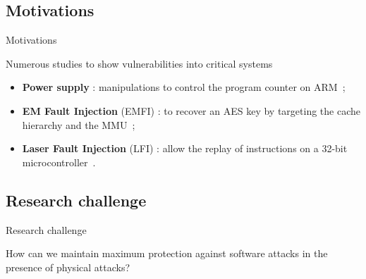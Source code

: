 \subsection{Motivations}
\begin{frame}{Motivations}
    \begin{block}{Numerous studies to show vulnerabilities into critical systems}
        \begin{itemize}
            \item \textbf{Power supply} : manipulations to control the program counter on ARM~\cite{TSW-16-fdtc};
            \item \textbf{EM Fault Injection} (EMFI) : to recover an AES key by targeting the cache hierarchy and the MMU~\cite{TBELB-21-jce};
            \item \textbf{Laser Fault Injection} (LFI) : allow the replay of instructions on a 32-bit microcontroller~\cite{KDD-21-dsd}.
        \end{itemize}
    \end{block}

\end{frame}
\subsection{Research challenge}
\begin{frame}{Research challenge}
    \begin{exampleblock}{}
        \centering
        \Large How can we maintain maximum protection against software attacks in the presence of physical attacks?
    \end{exampleblock}
\end{frame}

